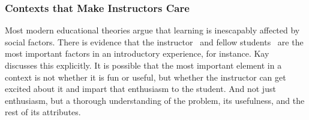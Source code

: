 \subsubsection{Contexts that Make Instructors Care}

Most modern educational theories argue that learning is inescapably affected by social factors.
There is evidence that the instructor~\cite{thompson2009engine} and fellow students~\cite{Barker:2009} are the most important factors in an introductory experience, for instance.
Kay~\cite{Kay:2011} discusses this explicitly.
It is possible that the most important element in a context is not whether it is fun or useful, but whether the instructor can get excited about it and impart that enthusiasm to the student.
And not just enthusiasm, but a thorough understanding of the problem, its usefulness, and the rest of its attributes.
